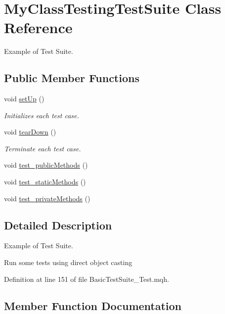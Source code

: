 \hypertarget{class_my_class_testing_test_suite}{}\section{My\+Class\+Testing\+Test\+Suite Class Reference}
\label{class_my_class_testing_test_suite}


Example of Test Suite.  


\subsection*{Public Member Functions}
\begin{DoxyCompactItemize}
\item 
void \mbox{\hyperlink{class_my_class_testing_test_suite_adbc1afafe2aa71c35e21f2d58d492ed8}{set\+Up}} ()
\begin{DoxyCompactList}\small\item\em Initializes each test case. \end{DoxyCompactList}\item 
void \mbox{\hyperlink{class_my_class_testing_test_suite_a57d7a3ad48dae9c768a2ec17f65503c4}{tear\+Down}} ()
\begin{DoxyCompactList}\small\item\em Terminate each test case. \end{DoxyCompactList}\item 
void \mbox{\hyperlink{class_my_class_testing_test_suite_a2f8139a2e71068665e18f99781358111}{test\+\_\+public\+Methods}} ()
\item 
void \mbox{\hyperlink{class_my_class_testing_test_suite_aadb56765b805c6dadcb2fb6d3c607e27}{test\+\_\+static\+Methods}} ()
\item 
void \mbox{\hyperlink{class_my_class_testing_test_suite_a4f3c0c96822f2d5d1a5ce80c47f156fb}{test\+\_\+private\+Methods}} ()
\end{DoxyCompactItemize}


\subsection{Detailed Description}
Example of Test Suite. 

Run some tests using direct object casting 

Definition at line 151 of file Basic\+Test\+Suite\+\_\+\+Test.\+mqh.



\subsection{Member Function Documentation}
\mbox{\label{class_my_class_testing_test_suite_adbc1afafe2aa71c35e21f2d58d492ed8}} 
